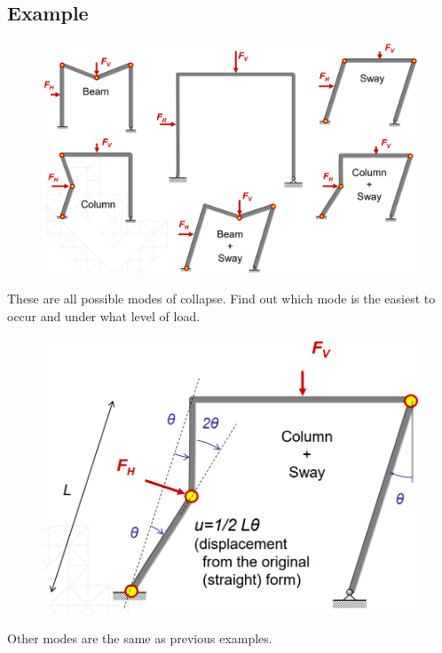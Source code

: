 \documentclass[class=report, crop=false, 12pt,a4paper]{standalone}
\begin{document}
\subsection*{Example}
\begin{figure}[H]
  \centering
  \includegraphics[width = 1 \textwidth]{../img/beam55.PNG}
\end{figure}
These are all possible modes of collapse. Find out which mode is the easiest to occur and under what level of load.
\begin{figure}[H]
  \centering
  \includegraphics[width = 0.65 \textwidth]{../img/beam56.PNG}
\end{figure}
Other modes are the same as previous examples.
\end{document}
